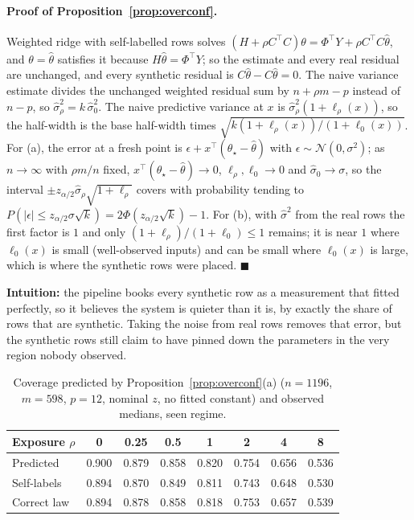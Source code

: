 \paragraph{Proof of Proposition~\ref{prop:overconf}.} Weighted ridge with self-labelled rows solves $(H+\rho C^\top C)\theta=\Phi^\top Y+\rho C^\top C\widehat\theta$, and $\theta=\widehat\theta$ satisfies it because $H\widehat\theta=\Phi^\top Y$; so the estimate and every real residual are unchanged, and every synthetic residual is $C\widehat\theta-C\widehat\theta=0$. The naive variance estimate divides the unchanged weighted residual sum by $n+\rho m-p$ instead of $n-p$, so $\widehat\sigma_\rho^2=k\,\widehat\sigma_0^2$. The naive predictive variance at $x$ is $\widehat\sigma_\rho^2(1+\ell_\rho(x))$, so the half-width is the base half-width times $\sqrt{k(1+\ell_\rho(x))/(1+\ell_0(x))}$. For (a), the error at a fresh point is $\epsilon+x^\top(\theta_\star-\widehat\theta)$ with $\epsilon\sim\mathcal N(0,\sigma^2)$; as $n\to\infty$ with $\rho m/n$ fixed, $x^\top(\theta_\star-\widehat\theta)\to0$, $\ell_\rho,\ell_0\to0$ and $\widehat\sigma_0\to\sigma$, so the interval $\pm z_{\alpha/2}\widehat\sigma_\rho\sqrt{1+\ell_\rho}$ covers with probability tending to $P(|\epsilon|\le z_{\alpha/2}\sigma\sqrt k)=2\Phi(z_{\alpha/2}\sqrt k)-1$. For (b), with $\widehat\sigma^2$ from the real rows the first factor is $1$ and only $(1+\ell_\rho)/(1+\ell_0)\le1$ remains; it is near $1$ where $\ell_0(x)$ is small (well-observed inputs) and can be small where $\ell_0(x)$ is large, which is where the synthetic rows were placed. \hfill$\blacksquare$

\textbf{Intuition:} the pipeline books every synthetic row as a measurement that fitted perfectly, so it believes the system is quieter than it is, by exactly the share of rows that are synthetic. Taking the noise from real rows removes that error, but the synthetic rows still claim to have pinned down the parameters in the very region nobody observed.

\begin{table}[H]\centering\small
\caption{Coverage predicted by Proposition~\ref{prop:overconf}(a) ($n=1196$, $m=598$, $p=12$, nominal $z$, no fitted constant) and observed medians, seen regime.}\label{tab:overconf}
\begin{tabular}{@{}lccccccc@{}}
\toprule
Exposure $\rho$ & 0 & 0.25 & 0.5 & 1 & 2 & 4 & 8\\
\midrule
Predicted & 0.900 & 0.879 & 0.858 & 0.820 & 0.754 & 0.656 & 0.536\\
Self-labels & 0.894 & 0.870 & 0.849 & 0.811 & 0.743 & 0.648 & 0.530\\
Correct law & 0.894 & 0.878 & 0.858 & 0.818 & 0.753 & 0.657 & 0.539\\
\bottomrule
\end{tabular}
\end{table}

